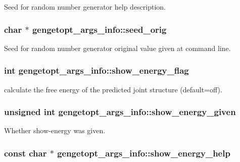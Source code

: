 Seed for random number generator help description. 

\hypertarget{structgengetopt__args__info_a9b36d9a37ede1d3c6cca9d13a45c3cae}{
\subsubsection[{seed\+\_\+orig}]{\setlength{\rightskip}{0pt plus 5cm}char $\ast$ gengetopt\+\_\+args\+\_\+info\+::seed\+\_\+orig}}\label{structgengetopt__args__info_a9b36d9a37ede1d3c6cca9d13a45c3cae}


Seed for random number generator original value given at command line. 

\hypertarget{structgengetopt__args__info_a53618c4b58a0f0c1ebc48f773878ae03}{
\subsubsection[{show\+\_\+energy\+\_\+flag}]{\setlength{\rightskip}{0pt plus 5cm}int gengetopt\+\_\+args\+\_\+info\+::show\+\_\+energy\+\_\+flag}}\label{structgengetopt__args__info_a53618c4b58a0f0c1ebc48f773878ae03}


calculate the free energy of the predicted joint structure (default=off). 

\hypertarget{structgengetopt__args__info_a0d4a4466189dbba0719c55a398fb30fa}{
\subsubsection[{show\+\_\+energy\+\_\+given}]{\setlength{\rightskip}{0pt plus 5cm}unsigned int gengetopt\+\_\+args\+\_\+info\+::show\+\_\+energy\+\_\+given}}\label{structgengetopt__args__info_a0d4a4466189dbba0719c55a398fb30fa}


Whether show-\/energy was given. 

\hypertarget{structgengetopt__args__info_a2deb60524353a2560c25fd0883cd225f}{
\subsubsection[{show\+\_\+energy\+\_\+help}]{\setlength{\rightskip}{0pt plus 5cm}const char $\ast$ gengetopt\+\_\+args\+\_\+info\+::show\+\_\+energy\+\_\+help}}\label{structgengetopt__args__info_a2deb60524353a2560c25fd0883cd225f}


